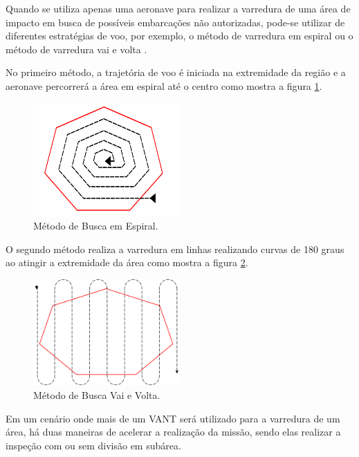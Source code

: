\label{Cap:Estrategia}

Quando se utiliza apenas uma aeronave para realizar a varredura de uma área de impacto em busca de possíveis embarcações não autorizadas, pode-se utilizar de diferentes estratégias de voo, por exemplo, o método de varredura em espiral ou o método de varredura vai e volta \cite{ost2012search}. 

No primeiro método, a trajetória de voo é iniciada na extremidade da região e a aeronave percorrerá a área em espiral até o centro como mostra a figura \ref{fig:espiral}. 

\begin{figure} 
\center
\includegraphics[width=0.5\textwidth]{espiral.png}
\caption{Método de Busca em Espiral.} 
\label{fig:espiral}
\end{figure} 

O segundo método realiza a varredura em linhas realizando curvas de 180 graus ao atingir a extremidade da área como mostra a figura \ref{fig:vaievolta}.

\begin{figure} 
\center
\includegraphics[width=0.5\textwidth]{vaievolta.png}
\caption{Método de Busca Vai e Volta.} 
\label{fig:vaievolta}
\end{figure} 

Em um cenário onde mais de um VANT será utilizado para a varredura de um área, há duas maneiras de acelerar a realização da missão, sendo elas realizar a inspeção com ou sem divisão em subárea. 

